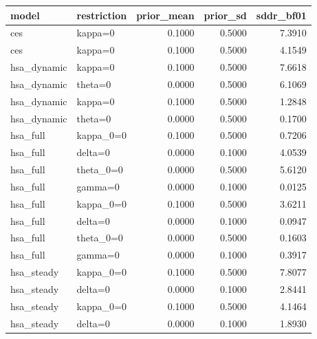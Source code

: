 \begin{tabular}{llrrr}
\toprule
model & restriction & prior\_mean & prior\_sd & sddr\_bf01 \\
\midrule
ces & kappa=0 & 0.1000 & 0.5000 & 7.3910 \\
ces & kappa=0 & 0.1000 & 0.5000 & 4.1549 \\
hsa\_dynamic & kappa=0 & 0.1000 & 0.5000 & 7.6618 \\
hsa\_dynamic & theta=0 & 0.0000 & 0.5000 & 6.1069 \\
hsa\_dynamic & kappa=0 & 0.1000 & 0.5000 & 1.2848 \\
hsa\_dynamic & theta=0 & 0.0000 & 0.5000 & 0.1700 \\
hsa\_full & kappa\_0=0 & 0.1000 & 0.5000 & 0.7206 \\
hsa\_full & delta=0 & 0.0000 & 0.1000 & 4.0539 \\
hsa\_full & theta\_0=0 & 0.0000 & 0.5000 & 5.6120 \\
hsa\_full & gamma=0 & 0.0000 & 0.1000 & 0.0125 \\
hsa\_full & kappa\_0=0 & 0.1000 & 0.5000 & 3.6211 \\
hsa\_full & delta=0 & 0.0000 & 0.1000 & 0.0947 \\
hsa\_full & theta\_0=0 & 0.0000 & 0.5000 & 0.1603 \\
hsa\_full & gamma=0 & 0.0000 & 0.1000 & 0.3917 \\
hsa\_steady & kappa\_0=0 & 0.1000 & 0.5000 & 7.8077 \\
hsa\_steady & delta=0 & 0.0000 & 0.1000 & 2.8441 \\
hsa\_steady & kappa\_0=0 & 0.1000 & 0.5000 & 4.1464 \\
hsa\_steady & delta=0 & 0.0000 & 0.1000 & 1.8930 \\
\bottomrule
\end{tabular}
